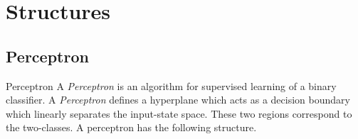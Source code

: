 \documentclass[11pt,a4paper]{article}
\begin{document}
\section{Structures}

\subsection{Perceptron}

  \begin{definition}{Perceptron}
    A \textit{Perceptron} is an algorithm for supervised learning of a binary classifier. A \textit{Perceptron} defines a hyperplane which acts as a decision boundary which linearly separates the input-state space. These two regions correspond to the two-classes. A perceptron has the following structure.

    \begin{center}
\end{center}
\end{definition}
\end{document}
